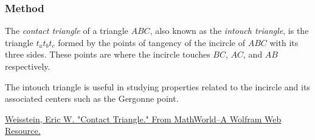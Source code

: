 \vspace{1em}

\begin{tkzexample}[latex=.5\textwidth]
\end{tkzexample}

\subsubsection{Method }
\label{ssub:method_triangle_intouch}

The \emph{contact triangle} of a triangle $ABC$, also known as the \emph{intouch triangle}, is the triangle $t_at_bt_c$ formed by the points of tangency of the incircle of $ABC$ with its three sides. These points are where the incircle touches $BC$, $AC$, and $AB$ respectively.

The intouch triangle is useful in studying properties related to the incircle and its associated centers such as the Gergonne point.
\begin{flushright}
  \small
\href{https://mathworld.wolfram.com/ContactTriangle.html}{Weisstein, Eric W. "Contact Triangle." From MathWorld--A Wolfram Web Resource.}
\end{flushright}

\vspace{1em}

